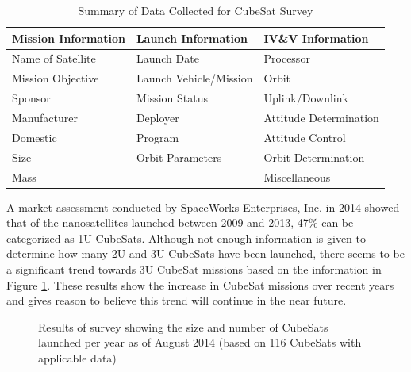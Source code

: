 \documentclass[11pt]{article}
\begin{document}
\begin{table}[h]
\centering
\caption{Summary of Data Collected for CubeSat Survey}
\label{summary}
\begin{tabular}{|l|l|l|}
\hline
\textbf{Mission Information} & \textbf{Launch Information} & \textbf{IV\&V Information} \\ \hline
Name of Satellite & Launch Date & Processor \\ \hline
Mission Objective & Launch Vehicle/Mission & Orbit \\ \hline
Sponsor & Mission Status & Uplink/Downlink \\ \hline
Manufacturer & Deployer & Attitude Determination \\ \hline
Domestic & Program & Attitude Control \\ \hline
Size & Orbit Parameters & Orbit Determination \\ \hline
Mass &  & Miscellaneous \\ \hline
\end{tabular}
\end{table}
A market assessment conducted by SpaceWorks Enterprises, Inc. in 2014 showed that of the nanosatellites launched between 2009 and 2013, 47\% can be categorized as 1U CubeSats.  Although not enough information is given to determine how many 2U and 3U CubeSats have been launched, there seems to be a significant trend towards 3U CubeSat missions based on the information in Figure \ref{peryear}.  These results show the increase in CubeSat missions over recent years and gives reason to believe this trend will continue in the near future.

\begin{figure}[h]
\centering
{}
\caption{Results of survey showing the size and number of CubeSats launched per year as of August 2014 (based on 116 CubeSats with applicable data)}
\label{peryear}
\end{figure}
\end{document}
